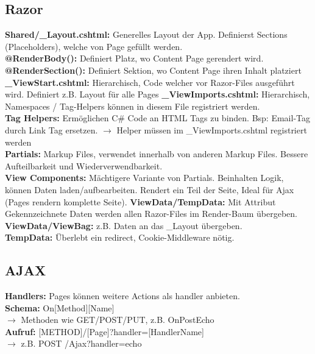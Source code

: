 \subsection{Razor}
\textcolor{b}{\textbf{Shared/\_Layout.cshtml:}} Generelles Layout der App. Definierst Sections (Placeholders), welche von Page gefüllt werden.\\
\textbf{@RenderBody():} Definiert Platz, wo Content Page gerendert wird.\\
\textbf{@RenderSection():} Definiert Sektion, wo Content Page ihren Inhalt platziert\\
\textcolor{b}{\textbf{\_ViewStart.cshtml:}} Hierarchisch, Code welcher vor Razor-Files ausgeführt wird. Definiert z.B. Layout für alle Pages
\textcolor{b}{\textbf{\_ViewImports.cshtml:}} Hierarchisch, Namespaces / Tag-Helpers können in diesem File registriert werden.\\
\textcolor{b}{\textbf{Tag Helpers:}} Ermöglichen C\# Code an HTML Tags zu binden. Bsp: Email-Tag durch Link Tag ersetzen. $\rightarrow$ Helper müssen im \_ViewImports.cshtml registriert werden\\
\textcolor{b}{\textbf{Partials:}} Markup Files, verwendet innerhalb von anderen Markup Files. Bessere Aufteilbarkeit und Wiederverwendbarkeit.\\
\textcolor{b}{\textbf{View Components:}} Mächtigere Variante von Partials. Beinhalten Logik, können Daten laden/aufbearbeiten. Rendert ein Teil der Seite, Ideal für Ajax (Pages rendern komplette Seite).
\textcolor{b}{\textbf{ViewData/TempData:}} Mit Attribut Gekennzeichnete Daten werden allen Razor-Files im Render-Baum übergeben.\\
\textbf{ViewData/ViewBag:} z.B. Daten an das \_Layout übergeben.\\
\textbf{TempData:} Überlebt ein redirect, Cookie-Middleware nötig.
\subsection{AJAX}
\textcolor{b}{\textbf{Handlers:}} Pages können weitere Actions als handler anbieten.\\
\textbf{Schema:} On[Method][Name]\\
$\rightarrow$ Methoden wie GET/POST/PUT, z.B. OnPostEcho\\
\textbf{Aufruf:} [METHOD]/[Page]?handler=[HandlerName]\\
$\rightarrow$ z.B. POST /Ajax?handler=echo
